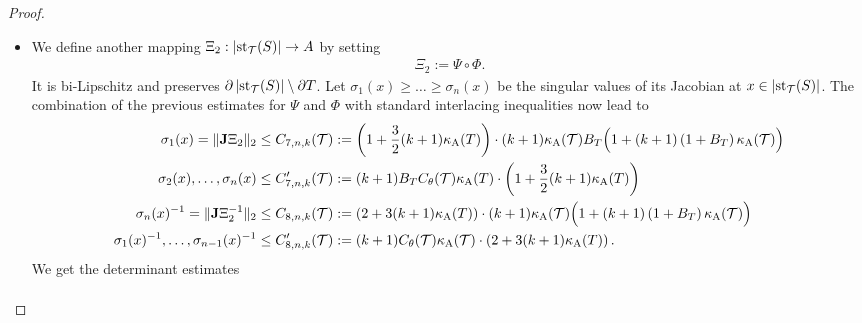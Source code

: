 \documentclass[10pt,a4paper]{article}
\begin{document}
\begin{proof}
\begin{itemize}
        
        \item 
        We define another mapping $ \Xi_{2} : \left| \operatorname{st}_{{\mathcal T}}(S) \right| \rightarrow A $ by setting 
        \begin{align*}
            \Xi_{2} := \Psi \circ \Phi.
        \end{align*}
        It is bi-Lipschitz and preserves $\partial\left| \operatorname{st}_{{\mathcal T}}(S) \right| \setminus \partial T$. 
        Let $\sigma_1(x) \geq \dots \geq \sigma_n(x)$ be the singular values of its Jacobian at $x \in \left| \operatorname{st}_{{\mathcal T}}(S) \right|$. 
        The combination of the previous estimates for $\Psi$ and $\Phi$ with standard interlacing inequalities now lead to 
        \begin{align*}
            \sigma_1(x)
            = 
            \|  {\mathbf{J}} \Xi_{2}  \|_{2}
            &\leq 
            C_{7,n,k}({\mathcal T})
            :=
            \left( 1 + \frac{3}{2} (k+1) \kappa_{\rm A}(T) \right)
            \cdot 
            (k+1) 
            \kappa_{\rm A}({\mathcal T})
            B_{T}
            \Big( 
                1 
                + 
                (k+1) 
                \left( 1 + B_{T} \right)
                \kappa_{\rm A}({\mathcal T})
            \Big)            
            \\
            \sigma_2(x), \dots, \sigma_n(x) 
            &\leq 
            C'_{7,n,k}({\mathcal T})
            :=
            (k+1)B_{T}
            C_\theta({\mathcal T})
            \kappa_{\rm A}(T) 
            \cdot 
            \left( 1 + \frac{3}{2} (k+1) \kappa_{\rm A}(T) \right)
            \\
            \sigma_n(x)^{-1}
            = 
            \|  {\mathbf{J}} \Xi_{2}^{-1}  \|_{2}
            &\leq  
            C_{8,n,k}({\mathcal T})
            :=
            \left( 2 + 3 (k+1) \kappa_{\rm A}(T) \right)
            \cdot 
            (k+1) 
            \kappa_{\rm A}({\mathcal T})
            \Big( 
                1 
                + 
                (k+1) 
                \left( 1 + B_{T} \right)
                \kappa_{\rm A}({\mathcal T})
            \Big)            
            \\
            \sigma_1(x)^{-1}, \dots, \sigma_{n-1}(x)^{-1}
            &\leq 
            C'_{8,n,k}({\mathcal T})
            :=
            (k+1)
            C_\theta({\mathcal T})
            \kappa_{\rm A}({\mathcal T}) 
            \cdot 
            \left( 2 + 3 (k+1) \kappa_{\rm A}(T) \right)
            .
        \end{align*}
        We get the determinant estimates 
        \begin{align*}

\end{align*}
\end{itemize}
\end{proof}
\end{document}
